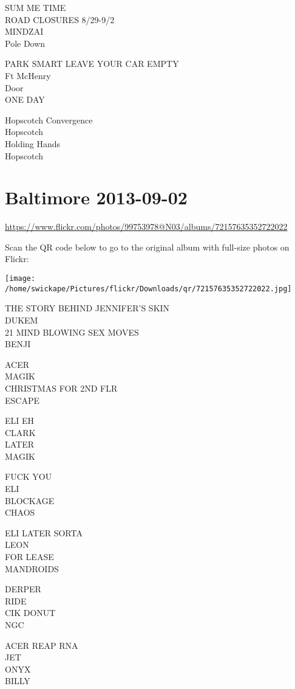 \documentclass[10pt,letterpaper]{article}
\begin{document}
SUM ME TIME\\
ROAD CLOSURES 8/29{-}9/2\\
MINDZAI\\
Pole Down

PARK SMART LEAVE YOUR CAR EMPTY\\
Ft McHenry\\
Door\\
ONE DAY

Hopscotch Convergence\\
Hopscotch\\
Holding Hands\\
Hopscotch


\section*{Baltimore 2013-09-02}

\url{https://www.flickr.com/photos/99753978@N03/albums/72157635352722022}

Scan the QR code below to go to the original album with full-size photos on Flickr:

\texttt{[image: /home/swickape/Pictures/flickr/Downloads/qr/72157635352722022.jpg]}


THE STORY BEHIND JENNIFER'S SKIN\\
DUKEM\\
21 MIND BLOWING SEX MOVES\\
BENJI

ACER\\
MAGIK\\
CHRISTMAS FOR 2ND FLR\\
ESCAPE

ELI EH\\
CLARK\\
LATER\\
MAGIK

FUCK YOU\\
ELI\\
BLOCKAGE\\
CHAOS

ELI LATER SORTA\\
LEON\\
FOR LEASE\\
MANDROIDS

DERPER\\
RIDE\\
CIK DONUT\\
NGC

ACER REAP RNA\\
JET\\
ONYX\\
BILLY
\end{document}
